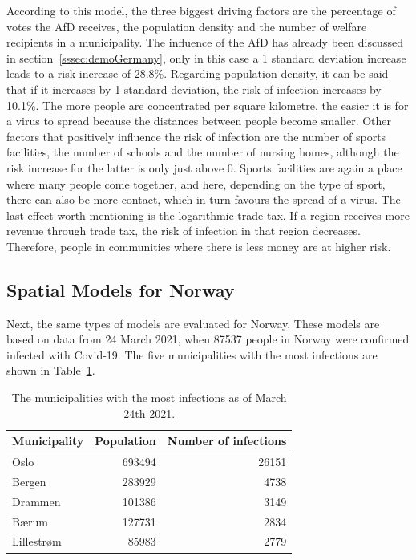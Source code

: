 According to this model, the three biggest driving factors are the percentage of votes the AfD receives, the population density and the number of welfare recipients in a municipality. The influence of the AfD has already been discussed in section~\ref{sssec:demoGermany}, only in this case a 1 standard deviation increase leads to a risk increase of 28.8\%. Regarding population density, it can be said that if it increases by 1 standard deviation, the risk of infection increases by 10.1\%. The more people are concentrated per square kilometre, the easier it is for a virus to spread because the distances between people become smaller. Other factors that positively influence the risk of infection are the number of sports facilities, the number of schools and the number of nursing homes, although the risk increase for the latter is only just above 0. Sports facilities are again a place where many people come together, and here, depending on the type of sport, there can also be more contact, which in turn favours the spread of a virus. The last effect worth mentioning is the logarithmic trade tax. If a region receives more revenue through trade tax, the risk of infection in that region decreases. Therefore, people in communities where there is less money are at higher risk. 
\subsection{Spatial Models for Norway}
Next, the same types of models are evaluated for Norway. These models are based on data from 24 March 2021, when 87537 people in Norway were confirmed infected with Covid-19. The five municipalities with the most infections are shown in Table~\ref{top5norway}.
\begin{table}[H] 
\caption{The municipalities with the most infections as of March 24th 2021. \label{top5norway}}
\begin{tabular}{l r r}
\toprule
\textbf{Municipality}	& \textbf{Population}	& \textbf{Number of infections} \\
\midrule
Oslo & 693494 & 26151 \\
Bergen & 283929 & 4738 \\
Drammen & 101386 & 3149 \\
Bærum & 127731 & 2834 \\
Lillestrøm & 85983 & 2779 \\
\bottomrule
\end{tabular}
\end{table}
